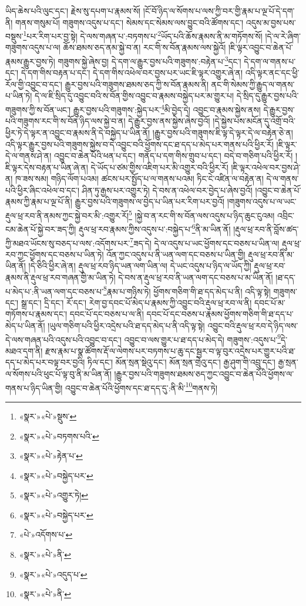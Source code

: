 ཡིད་ཆེས་པའི་ལུང་དང་། རྗེས་སུ་དཔག་པ་རྣམས་སོ། །ངོ་བོ་ཉིད་ལ་སོགས་པ་ལས་ཀྱི་བར་གྱི་རྣམ་པ་ལྔ་པོ་དེ་དག་ནི། གནས་གསུམ་པོ། གཟུགས་འདུས་པ་དང་། སེམས་དང་སེམས་ལས་བྱུང་བའི་ཚོགས་དང་། འདུས་མ་བྱས་པས་བསྡུས་\footnote{«སྣར་»«པེ་»སྡུས་}པར་རིག་པར་བྱ་སྟེ། དེ་ལས་གཞན་པ་:བཏགས་པ་\footnote{«སྣར་»«པེ་»བཏགས་པའི་}ཡོད་པའི་ཆོས་རྣམས་ནི་མ་གཏོགས་སོ། །དེ་ལ་རེ་ཞིག་གཟུགས་འདུས་པ་ལ། ཆོས་ཐམས་ཅད་ནམ་སྐྱེ་བ་ན། རང་གི་ས་བོན་རྣམས་ལས་སྐྱེའོ། །ཇི་ལྟར་འབྱུང་བ་ཆེན་པོ་རྣམས་རྒྱུར་བྱས་ཏེ། གཟུགས་སྐྱེ་ཞེས་བྱ། དེ་དག་ལ་རྒྱུར་བྱས་པའི་གཟུགས་:བརྟེན་པ་\footnote{«སྣར་»«པེ་»རྟེན་པ་}དང་། དེ་དག་ལ་གནས་པ་དང་། དེ་དག་གིས་བརྟན་པ་དང་། དེ་དག་གིས་འཕེལ་བར་བྱས་པར་ཡང་ཇི་ལྟར་འགྱུར་ཞེ་ན། འདི་ལྟར་ནང་དང་ཕྱི་རོལ་གྱི་འབྱུང་བ་དང་། རྒྱུར་བྱས་པའི་གཟུགས་ཐམས་ཅད་ཀྱི་ས་བོན་རྣམས་ནི། ནང་གི་སེམས་ཀྱི་རྒྱུད་ལ་གནས་པ་ཡིན་ཏེ། དེ་ལ་ཇི་སྲིད་དུ་འབྱུང་བའི་ས་བོན་གྱིས་འབྱུང་བ་རྣམས་བསྐྱེད་པར་མ་གྱུར་པ། དེ་སྲིད་དུ་རྒྱུར་བྱས་པའི་གཟུགས་ཀྱི་ས་བོན་ཡང་། རྒྱུར་བྱས་པའི་གཟུགས་:སྐྱེད་པར་\footnote{«སྣར་»«པེ་»བསྐྱེད་པར་}མི་བྱེད་དེ། འབྱུང་བ་རྣམས་སྐྱེས་ནས། དེ་རྒྱུར་བྱས་པའི་གཟུགས་རང་གི་ས་བོན་ཉིད་ལས་སྐྱེ་བ་ན། དེ་རྒྱུར་བྱས་ནས་སྐྱེས་ཞེས་བྱའོ། །དེ་སྐྱེས་པས་མངོན་དུ་འགྲོ་བའི་ཕྱིར་ཏེ་དེ་ལྟར་ན་འབྱུང་བ་རྣམས་ནི་དེ་བསྐྱེད་པ་ཡིན་ནོ། །རྒྱུར་བྱས་པའི་གཟུགས་ཇི་ལྟ་དེ་ལྟར་དེ་ལ་བརྟེན་ཅེ་ན། འདི་ལྟར་རྒྱུར་བྱས་པའི་གཟུགས་སྐྱེས་བ་དེ་འབྱུང་བའི་ཕྱོགས་དང་ཐ་དད་པ་མེད་པར་གནས་པའི་ཕྱིར་རོ། །ཇི་ལྟར་དེ་ལ་གནས་ཤེ་ན། འབྱུང་བ་ཆེན་པོའི་ཕན་པ་དང་། གནོད་པ་དག་གིས་གྲུབ་པ་དང་། བདེ་བ་གཅིག་པའི་ཕྱིར་རོ། །ཇི་ལྟར་དེས་བརྟན་པ་ཡིན་ཞེ་ན། དེ་ཡོད་པ་ཙམ་གྱིས་འཇིག་པར་མི་འགྱུར་བའི་ཕྱིར་རོ། །ཇི་ལྟར་འཕེལ་བར་བྱས་ཤེ་ན། ཁ་ཟས་སམ། གཉིད་ལོག་པའམ། ཚངས་པར་སྤྱོད་པ་ལ་གནས་པའམ། ཏིང་ངེ་འཛིན་ལ་བརྟེན་ན། དེ་ལ་གནས་པའི་ཕྱིར་ཞིང་འཕེལ་བ་དང་། ཤིན་ཏུ་རྒྱས་པར་འགྱུར་ཏེ། དེ་བས་ན་འཕེལ་བར་བྱེད་པ་ཞེས་བྱའོ། །འབྱུང་བ་ཆེན་པོ་རྣམས་ཀྱི་རྣམ་པ་ལྔ་པོ་ནི། རྒྱུར་བྱས་པའི་གཟུགས་ལ་བྱེད་པ་ཡིན་པར་རིག་པར་བྱའོ། །གཟུགས་འདུས་པ་ལ་ཡང་རྡུལ་ཕྲ་རབ་ནི་ནམས་ཀྱང་སྐྱེ་བར་མི་:འགྱུར་རོ།\footnote{«སྣར་»«པེ་»འགྱུར་ཏེ།} །སྐྱེ་བ་ན་རང་གི་ས་བོན་ལས་འདུས་པ་ཉིད་ཆུང་ངུའམ། འབྲིང་ངམ་ཆེན་པོ་སྐྱེ་བར་ཟད་ཀྱི། རྡུལ་ཕྲ་རབ་རྣམས་ཀྱིས་འདུས་པ་:བསྐྱེད་པ་\footnote{«སྣར་»«པེ་»བསྐྱེད་པར་}ནི་མ་ཡིན་ནོ། །རྡུལ་ཕྲ་རབ་ནི་བློས་ཚད་ཀྱི་མཐའ་ཡོངས་སུ་བཅད་པ་ལས་:འདོགས་པར་\footnote{«པེ་»འདོགས་པ་}ཟད་དེ། དེ་ལ་འདུས་པ་ཡང་ཕྱོགས་དང་བཅས་པ་ཡིན་ལ། རྡུལ་ཕྲ་རབ་ཀྱང་ཕྱོགས་དང་བཅས་པ་ཡིན་ཏེ། འོན་ཀྱང་འདུས་པ་ནི་ཡན་ལག་དང་བཅས་པ་ཡིན་གྱི། རྡུལ་ཕྲ་རབ་ནི་མ་ཡིན་ནོ། །དེ་ཅིའི་ཕྱིར་ཞེ་ན། རྡུལ་ཕྲ་རབ་ཉིད་ཡན་ལག་ཡིན་ལ། དེ་ཡང་འདུས་པ་ཉིད་ལ་ཡོད་ཀྱི། རྡུལ་ཕྲ་རབ་རྣམས་ནི་རྡུལ་ཕྲ་རབ་གཞན་གྱི་མ་ཡིན་ཏེ། དེ་བས་ན་རྡུལ་ཕྲ་རབ་ནི་ཡན་ལག་དང་བཅས་པ་མ་ཡིན་ནོ། །ཐ་དད་པ་མེད་པ་:ནི་ཡན་ལག་དང་བཅས་པ་\footnote{«སྣར་»«པེ་»ནི་}རྣམ་པ་གཉིས་ཏེ། ཕྱོགས་གཅིག་གི་ཐ་དད་མེད་པ་ནི། འདི་ལྟ་སྟེ། གཟུགས་དང་། སྒྲ་དང་། དྲི་དང་། རོ་དང་། རེག་བྱ་དབང་པོ་མེད་པ་རྣམས་ཀྱི་འབྱུང་བའི་རྡུལ་ཕྲ་རབ་ལ་ནི། དབང་པོ་མ་གཏོགས་པ་རྣམས་དང་། དབང་པོ་དང་བཅས་པ་ལ་ནི། དབང་པོ་དང་བཅས་པ་རྣམས་ཕྱོགས་གཅིག་གི་ཐ་དད་པ་མེད་པ་ཡིན་ནོ། །ཡུལ་གཅིག་པའི་ཕྱིར་འདྲེས་པའི་ཐ་དད་མེད་པ་ནི་འདི་ལྟ་སྟེ། འབྱུང་བའི་རྡུལ་ཕྲ་རབ་དེ་ཉིད་ལས་དེ་ལས་གཞན་པའི་འདུས་པའི་འབྱུང་བ་དང་། འབྱུང་བ་ལས་གྱུར་པ་ཐ་དད་པ་མེད་དེ། གཟུགས་:འདུས་པ་\footnote{«སྣར་»«པེ་»འདུད་པ་}དེ་མཐའ་དག་ནི། རྫས་རྣམ་པ་སྣ་ཚོགས་རྡོ་ལ་ལེགས་པར་བཏགས་པ་ཆུ་དང་སྦྱར་བ་ལྟ་བུར་འདྲེས་པར་གྱུར་པའི་ཐ་དད་པ་མེད་པར་བལྟ་བར་བྱའི། ཏིལ་དང་། མོན་སྲན་སྡེའུ་དང་། མོན་སྲན་གྲེའུ་དང་། རྒྱ་ཤུག་གི་འབྲུ་དང་། རྒྱ་སྲན་ལ་སོགས་པའི་ཕུང་པོ་ལྟ་བུ་ནི་མ་ཡིན་ནོ། །རྒྱུར་བྱས་པའི་གཟུགས་ཐམས་ཅད་ཀྱང་འབྱུང་བ་ཆེན་པོའི་ཕྱོགས་ལ་གནས་པ་ཉིད་ཡིན་གྱི། འབྱུང་བ་ཆེན་པོའི་ཕྱོགས་དང་ཐ་དད་དུ་:ནི་མི་\footnote{«སྣར་»«པེ་»ནི་}གནས་ཏེ། 